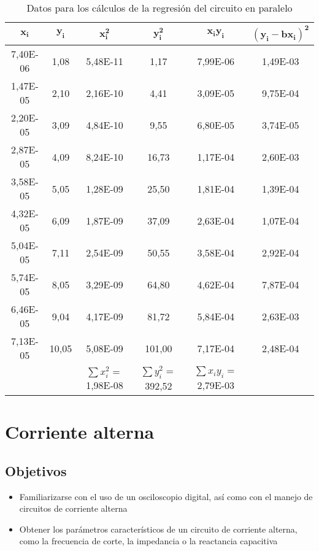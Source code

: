 \documentclass[a4paper,12pt,titlepage]{article}
\begin{document}
\begin{itemize}
    \begin{table}[h!]
        \centering
        \begin{tabular}{|c|c|c|c|c|c|}
        \hline
        $\mathbf{x_{i}}$ & $\mathbf{y_{i}}$ & $\mathbf{x_ {i}^2}$ & $\mathbf{y_{i}^2}$ & $\mathbf{x_{i}y_{i}}$  & $\mathbf{(y_{i}-bx_{i})^2}$   \\ \hline
        7,40E-06 & 1,08  & 5,48E-11 & 1,17   & 7,99E-06 & 1,49E-03 \\ \hline
        1,47E-05 & 2,10   & 2,16E-10 & 4,41     & 3,09E-05 & 9,75E-04 \\ \hline
        2,20E-05 & 3,09  & 4,84E-10 & 9,55   & 6,80E-05 & 3,74E-05 \\ \hline
        2,87E-05 & 4,09  & 8,24E-10 & 16,73  & 1,17E-04 & 2,60E-03 \\ \hline
        3,58E-05 & 5,05  & 1,28E-09 & 25,50  & 1,81E-04 & 1,39E-04 \\ \hline
        4,32E-05 & 6,09  & 1,87E-09 & 37,09  & 2,63E-04 & 1,07E-04 \\ \hline
        5,04E-05 & 7,11  & 2,54E-09 & 50,55  & 3,58E-04 & 2,92E-04 \\ \hline
        5,74E-05 & 8,05  & 3,29E-09 & 64,80  & 4,62E-04 & 7,87E-04 \\ \hline
        6,46E-05 & 9,04  & 4,17E-09 & 81,72  & 5,84E-04 & 2,63E-03 \\ \hline
        7,13E-05 & 10,05 & 5,08E-09 & 101,00 & 7,17E-04 & 2,48E-04 \\ \hline
                 &       & $\sum x_{i}^2=$1,98E-08 & $\sum y_{i}^2=$392,52 & $\sum x_{i}y_{i}=$2,79E-03 &          \\ \hline
        \end{tabular}
        \caption{Datos para los cálculos de la regresión del circuito en paralelo}
        \label{tab:my-table}
\end{table}

\end{itemize}


\newpage

\section{Corriente alterna}
\subsection{Objetivos}
\begin{itemize}
    \item Familiarizarse con el uso de un osciloscopio digital, así como con el manejo de circuitos de corriente alterna
    \item Obtener los parámetros característicos de un circuito de corriente alterna, como la frecuencia de corte, la impedancia o la reactancia capacitiva
 
\end{itemize}
\end{document}
